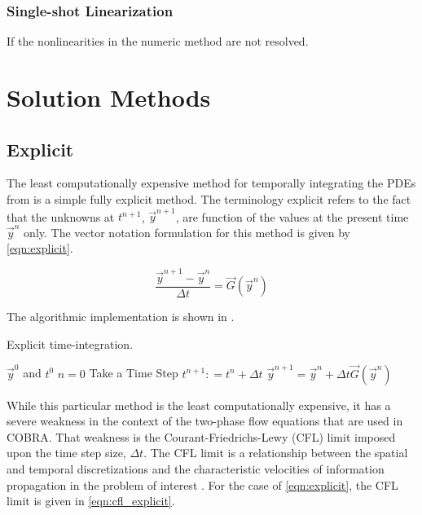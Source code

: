 \subsubsection{Single-shot Linearization}
\label{subsubsect:single_shot}
If the nonlinearities in the numeric method are not resolved.


\section{Solution Methods}
\label{sect:solution_techniques}

\subsection{Explicit}
\label{subsect:numerics_explicit}
The least computationally expensive method for temporally integrating the PDEs from  is a simple fully explicit method.
The terminology explicit refers to the fact that the unknowns at $t^{n+1}$, $\vec{y}^{n+1}$, are function of the values at the present time $\vec{y}^{n}$ only.
The vector notation formulation for this method is given by \eqref{eqn:explicit}. 

\begin{equation}
\label{eqn:explicit}
\frac{ \vec{y}^{n+1} - \vec{y}^{n}}{\Delta t} = \vec{G}(\vec{y}^{n})
\end{equation}

The algorithmic implementation is shown in .

\begin{algo}[H]
\caption{Explicit time-integration.}
\label{algo:explicit}
\setlength{\baselineskip}{0.625\baselineskip}
\begin{algorithmic}[1]
\Require $\vec{y}^{0}$ and $t^{0}$
\Set $n = 0$
\Loop \; Take a Time Step
    \State $t^{n+1} : = t^{n} + \Delta t$
    \Calculate $\vec{y}^{n+1} = \vec{y}^{n} + \Delta t \vec{G}(\vec{y}^n)$
\end{algorithmic}
\end{algo}

While this particular method is the least computationally expensive, it has a severe weakness in the context of the two-phase flow equations that are used in COBRA.
That weakness is the Courant-Friedrichs-Lewy (CFL) limit imposed upon the time step size, $\Delta t$.
The CFL limit is a relationship between the spatial and temporal discretizations and the characteristic velocities of information propagation in the problem of interest \cite{LeVeque2007, Tannehill1997}.
For the case of \eqref{eqn:explicit}, the CFL limit is given in \eqref{eqn:cfl_explicit}.


